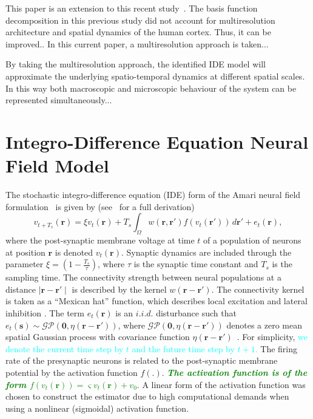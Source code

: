 \documentclass[journal,a4paper]{IEEEtran}
\newcommand{\dean}[1]{\textsf{\emph{\textbf{\textcolor{green}{#1}}}}}
\newcommand{\cut}[1]{\textcolor{cyan}{#1}}
\begin{document}
This paper is an extension to this recent study~\cite{Freestone2011}. The basis function decomposition in this previous study did not account for multiresolution architecture and spatial dynamics of the human cortex. Thus, it can be improved.. In this current paper, a multiresolution approach is taken...

By taking the multiresolution approach, the identified IDE model will approximate the underlying spatio-temporal dynamics at different spatial scales. In this way both macroscopic and microscopic behaviour of the system can be represented simultaneously...

\section{Integro-Difference Equation Neural Field Model}
The stochastic integro-difference equation (IDE) form of the Amari neural field  formulation~\cite{Amari1977} is given by (see~\cite{Freestone2011} for a full derivation)
\begin{equation}\label{eq:DiscreteTimeModel}
	v_{t+T_s}\left(\mathbf{r}\right) = 
	\xi v_t\left(\mathbf{r}\right) + 
	T_s \int_\Omega { 
	    w\left(\mathbf{r},\mathbf{r'}\right)
	    f\left(v_t\left(\mathbf{r}'\right)\right) 
	\, d\mathbf{r}'} 
	+ e_t\left(\mathbf{r}\right), 
\end{equation}
where the post-synaptic membrane voltage at time $t$ of a population of neurons at position $\mathbf r$ is denoted $v_t\left(\mathbf r\right)$. Synaptic dynamics are included through the parameter $\xi=\left(1-\frac{ T_s}{\tau}\right)$, where $\tau$ is the synaptic time constant and $T_s$ is the sampling time. The connectivity strength between neural populations at a distance $\mid\mathbf{r}-\mathbf{r'}\mid$ is described by the kernel $w\left(\mathbf{r}-\mathbf{r}'\right)$. The connectivity kernel is taken as a ``Mexican hat'' function, which describes local excitation and lateral inhibition \cite{Amari1977}. The term $e_t(\mathbf r)$ is an $i.i.d.$ disturbance such that $e_t(\mathbf{s})\sim\mathcal{GP}(\mathbf 0,\eta(\mathbf{r}-\mathbf{r'}))$, where $\mathcal{GP}(\mathbf 0,\eta(\mathbf{r}-\mathbf{r'}))$  denotes a zero mean spatial Gaussian process with covariance function $\eta(\mathbf{r}-\mathbf{r'})$~\cite{Rasmussen2005}. For simplicity, \cut{we denote the current time step by $t$ and the future time step by $t+1$.} The firing rate of the presynaptic neurons is related to the post-synaptic membrane potential by the activation function $f\left(.\right)$. \dean{The activation function is of the form $f(v_t(\mathbf{r})) = \varsigma v_t(\mathbf{r}) + v_0$}. A linear form of the activation function was chosen to construct the estimator due to high computational demands when using a nonlinear (sigmoidal) activation function.
\end{document}
